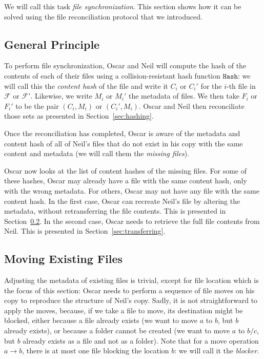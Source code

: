 \documentclass[twoside,envcountsame,runningheads]{llncs}
\newcommand{\Files}{\mathcal{F}}
\newcommand{\Hash}{\ensuremath{\mathtt{Hash}}}
\begin{document}
We will call this task \emph{file synchronization}. This section shows how it can be solved using the file reconciliation protocol that we introduced.

\subsection{General Principle}

To perform file synchronization, Oscar and Neil will compute the hash of the
contents of each of their files using a collision-resistant hash function
$\Hash$: we will call this the \emph{content hash} of the file and write it
$C_i$ or $C_i'$ for the $i$-th file in $\Files$ or $\Files'$. Likewise, we
write $M_i$ or $M_i'$ the metadata of files. We then take $F_i$ or $F_i'$ to be
the pair $(C_i, M_i)$ or $(C_i', M_i)$. Oscar and Neil then reconciliate those
sets as presented in Section~\ref{sec:hashing}.

Once the reconciliation has completed, Oscar is aware of the metadata and
content hash of all of Neil's files that do not exist in his copy with the same
content and metadata (we will call them the \emph{missing files}).

Oscar now looks at the list of content hashes of the missing files. For some of
these hashes, Oscar may already have a file with the same content hash, only
with the wrong metadata. For others, Oscar may not have any file with the same
content hash. In the first case, Oscar can recreate Neil's file by altering the
metadata, without retransferring the file contents. This is presented in
Section~\ref{sec:moving}. In the second case, Oscar needs to retrieve the full
file contents from Neil. This is presented in Section~\ref{sec:transferring}.

\subsection{Moving Existing Files}
\label{sec:moving}

Adjusting the metadata of existing files is trivial, except for file location which is the focus of this section: Oscar needs to perform a sequence of file moves on his copy to reproduce the structure of Neil's copy. Sadly, it is not straightforward to apply the moves, because, if we take a file to move, its destination might be blocked, either because a file already exists (we want to move $a$ to $b$, but $b$ already exists), or because a folder cannot be created (we want to move $a$ to $b/c$, but $b$ already exists as a file and not as a folder). Note that for a move operation $a \rightarrow b$, there is at most one file blocking the location $b$: we will call it the \textit{blocker}.
\end{document}
